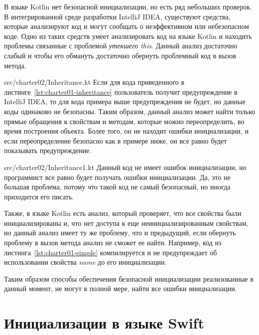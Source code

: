 В языке Kotlin нет безопасной инициализации, но есть ряд небольших проверок.
В интегрированной среде разработки IntelliJ IDEA, существуют средства,
которые анализируют код и могут сообщать о неэффективном или небезопасном коде.
Одно из таких средств умеет анализировать код на языке Kotlin и находить проблемы связанные с проблемой \textit{утекшего this}.
Данный анализ достаточно слабый и чтобы его обмануть достаточно обернуть проблемный код в вызов метода.

{src/charter02/Inheritance.kt}
Если для кода приведенного в листинге~\ref{lst:charter01-inheritance} пользователь получит предупреждение в IntelliJ IDEA,
то для кода примера выше предупреждения не будет, но данные коды одинаково не безопасны.
Таким образом, данный анализ может найти только прямые обращения к свойствам и методам, которые можно переопределить,
во время построения объекта.
Более того, он не находит ошибки инициализации, и если переопределение безопасно как в примере ниже,
он все равно будет показывать предупреждение.

{src/charter02/Inheritance1.kt}
Данный код не имеет ошибок инициализации, но программист все равно будет получать ошибки инициализации.
Да, это не большая проблема, потому что такой код не самый безопасный, но иногда приходится его писать.

Также, в языке Kotlin есть анализ, который проверяет, что все свойства были инициализированы и,
что нет доступа к еще неинициализированным свойствам, но данный анализ имеет ту же проблему, что и предыдущий,
если обернуть проблему в вызов метода анализ не сможет ее найти.
Например, код из листинга~\ref{lst:charter01-simple} компилируется и не предупреждает об использовании свойства \emph{name}
до его инициализации.

Таким образом способы обеспечения безопасной инициализации реализованные в данный момент, не могут в полной мере,
найти все ошибки инициализации.


\section{Инициализации в языке Swift}\label{sec:инициализации-в-языке-swift}

